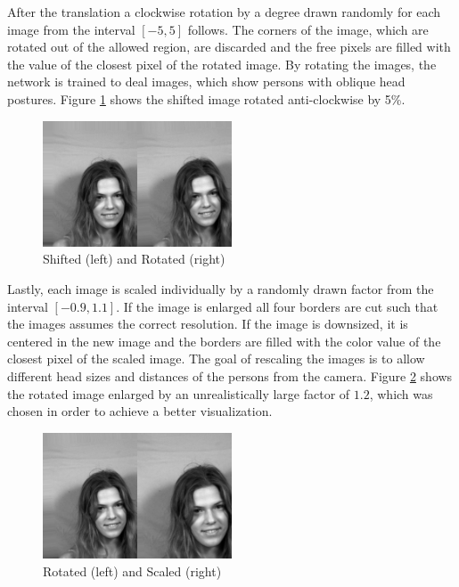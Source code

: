 \documentclass[11pt, a4paper]{article}
\begin{document}
After the translation a clockwise rotation by a degree drawn randomly for each image from the interval $[-5,5]$ follows. The corners of the image, which are rotated out of the allowed region, are discarded and the free pixels are filled with the value of the closest pixel of the rotated image. By rotating the images, the network is trained to deal images, which show persons with oblique head postures. Figure \ref{fig:shifted_rotated} shows the shifted image rotated anti-clockwise by 5\%.

\begin{figure}[htbp]
	\centering
	\includegraphics[width=0.5\textwidth]{shifted_rotated.png}
	\caption{Shifted (left) and Rotated (right)}
	\label{fig:shifted_rotated}
\end{figure}

Lastly, each image is scaled individually by a randomly drawn factor from the interval $[-0.9,1.1]$. If the image is enlarged all four borders are cut such that the images assumes the correct resolution. If the image is downsized, it is centered in the new image and the borders are filled with the color value of the closest pixel of the scaled image. The goal of rescaling the images is to allow different head sizes and distances of the persons from the camera. Figure \ref{fig:rotated_scaled} shows the rotated image enlarged by an unrealistically large factor of $1.2$, which was chosen in order to achieve a better visualization.

\begin{figure}[htbp]
	\centering
	\includegraphics[width=0.5\textwidth]{rotated_scaled.png}
	\caption{Rotated (left) and Scaled (right)}
	\label{fig:rotated_scaled}
\end{figure}
\end{document}
